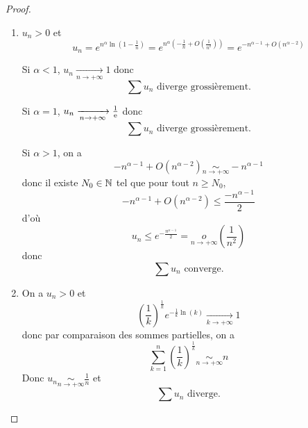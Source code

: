 \documentclass[12pt]{article}
\begin{document}
\begin{proof}
	\phantom{}
	\begin{enumerate}
		\item $u_{n}>0$ et 
		\begin{equation}u_{n}=e^{n^{\alpha}\ln\left(1-\frac{1}{n}\right)}=e^{n^{\alpha}\left(-\frac{1}{n}+O\left(\frac{1}{n^{2}}\right)\right)}=e^{-n^{\alpha-1}+O\left(n^{\alpha-2}\right)}\end{equation}

		Si $\alpha<1$, $u_{n}\xrightarrow[n\to+\infty]{}1$ donc 
		\begin{equation}\boxed{\sum u_{n}\text{ diverge grossièrement.}}\end{equation}

		Si $\alpha=1$, $u_{n}\xrightarrow[n\to+\infty]{}\frac{1}{\mathrm{e}}$ donc 
		\begin{equation}\boxed{\sum u_{n}\text{ diverge grossièrement.}}\end{equation}

		Si $\alpha>1$, on a 
		\begin{equation}-n^{\alpha-1}+O\left(n^{\alpha-2}\right)\underset{n\to+\infty}{\sim}-n^{\alpha-1}\end{equation}
		donc il existe $N_{0}\in\mathbb{N}$ tel que pour tout $n\geqslant N_{0}$,
		\begin{equation}-n^{\alpha-1}+O\left(n^{\alpha-2}\right)\leqslant\frac{-n^{\alpha-1}}{2}\end{equation}
		d'où 
		\begin{equation}u_{n}\leqslant e^{-\frac{n^{\alpha-1}}{2}}=\underset{n\to+\infty}{o}\left(\frac{1}{n^{2}}\right)\end{equation}
		donc 
		\begin{equation}\boxed{\sum u_{n}\text{ converge.}}\end{equation}

		\item On a $u_{n}>0$ et 
		\begin{equation}\left(\frac{1}{k}\right)^{\frac{1}{k}}e^{-\frac{1}{k}\ln(k)}\xrightarrow[k\to+\infty]{}1\end{equation}
		donc par comparaison des sommes partielles, on a 
		\begin{equation}\sum_{k=1}^{n}\left(\frac{1}{k}\right)^{\frac{1}{k}}\underset{n\to+\infty}{\sim}n\end{equation}
		Donc $u_{n}\underset{n\to+\infty}{\sim}\frac{1}{n}$ et 
		\begin{equation}\boxed{\sum u_{n}\text{ diverge.}}\end{equation}


\end{enumerate}
\end{proof}
\end{document}
